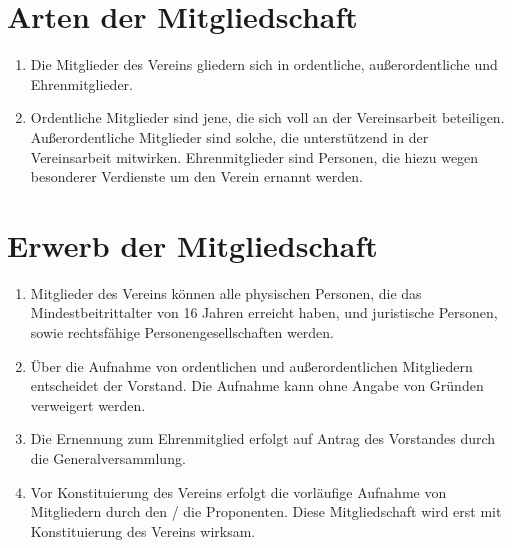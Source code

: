 \documentclass[a4paper,12pt]{article}
\newcommand{\comment}[1]{{\bf /*Komm.:} \textit{#1} {\bf */}}
\def\comment#1{}
\begin{document}
\section{Arten der Mitgliedschaft} %
\label{sec:Mitgliedschaft-Arten}
\begin{enumerate}
\item Die Mitglieder des Vereins gliedern sich in ordentliche, außerordentliche und Ehrenmitglieder.

\item Ordentliche Mitglieder sind jene, die sich voll an der Vereinsarbeit beteiligen.
Außerordentliche Mitglieder sind solche, die unterstützend in der Vereinsarbeit mitwirken. Ehrenmitglieder sind Personen, die hiezu wegen besonderer Verdienste um den Verein ernannt werden.

\comment{\item VarB: Ordentliche Mitglieder sind jene, die sich voll an der Vereinsarbeit beteiligen.
Außerordentliche Mitglieder sind solche, die die Vereinstätigkeit vor allem durch Zahlung eines erhöhten Mitgliedsbeitrags fördern.
\comment{Marco: Zu spezifisch imo}
\comment{War vorher:Außerordentliche Mitglieder sind solche, die unterstützend in der Vereinsarbeit mitwirken.}
Ehrenmitglieder sind Personen, die hierzu wegen besonderer Verdienste um den Verein ernannt werden.}
\end{enumerate}

\section{Erwerb der Mitgliedschaft} %
\begin{enumerate}
\item Mitglieder des Vereins können alle physischen Personen, die das Mindestbeitrittalter von 16 Jahren erreicht haben, und juristische Personen, sowie rechtsfähige Personengesellschaften werden.
\item Über die Aufnahme von ordentlichen und au{\ss}erordentlichen Mitgliedern entscheidet der Vorstand. Die Aufnahme kann ohne Angabe von Gründen verweigert werden.
\item Die Ernennung zum Ehrenmitglied erfolgt auf Antrag des Vorstandes durch die Generalversammlung.
\item Vor Konstituierung des Vereins erfolgt die vorläufige Aufnahme von Mitgliedern durch den / die Proponenten. Diese Mitgliedschaft wird erst mit Konstituierung des Vereins wirksam.
\end{enumerate}
\end{document}
